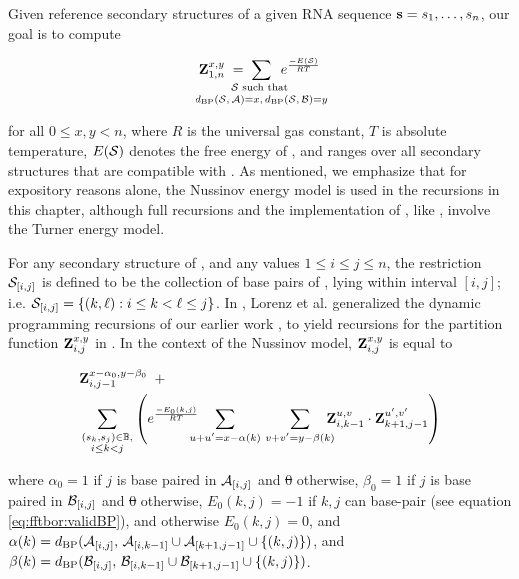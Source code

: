 \documentclass[11pt, oneside]{Thesis} %
\providecommand{\DIFadd}[1]{{\protect\color{blue}\uwave{#1}}} %
\providecommand{\DIFdel}[1]{{\protect\color{red}\sout{#1}}}                      %
\providecommand{\DIFaddbegin}{} %
\providecommand{\DIFaddend}{} %
\providecommand{\DIFdelbegin}{} %
\providecommand{\DIFdelend}{} %
\begin{document}
Given reference secondary structures \strAB of a
given RNA sequence ${\bf s}=s_1,\dots,s_n$, our goal is to compute

\begin{align}
\label{eq:ffttwo:sumBoltzFactors}
\bfZ{x,y}{1,n}\;=\;
\sum_{\mathclap{\substack{
\str \text{ such that } \rule[-.5ex]{0pt}{0pt} \\
\dBP{\str}{\strA} = x,\,\dBP{\str}{\strB} = y}}}\enspace
\boltzF{\str}
\end{align}

for all $0 \leq x,y < n$, where $R$ is the universal gas constant, $T$
is absolute temperature, $E(\mathcal S)$ denotes the free energy of \str,
and \str ranges
over all secondary structures that are compatible with \seq. As mentioned,
we emphasize that for expository reasons alone, the Nussinov energy model is
used in the recursions in this chapter, although full recursions and
the implementation of \ffttwo, like \fftbor, involve the Turner energy model.

For any secondary structure \str of \seq, and any values
$1 \leq i \leq j \leq n$, the restriction $\mathcal S_{[i,j]}$ is defined to be the
collection of base pairs of \str, lying within interval $[i,j]$; i.e.
$\mathcal S_{[i,j]} = \{ (k, \ell) : i \leq k < \ell \leq j \}$.
In \citep{hofacker:RNAbor2D}, Lorenz et al. generalized
the dynamic programming recursions of our earlier work \citep{freyhult.b07},
to yield recursions
for the partition function ${\bf Z}^{x,y}_{i,j}$ in
. In the context of the Nussinov model,
${\bf Z}^{x,y}_{i,j}$ is equal to

\begin{align}
\label{eq:ffttwo:bfZabij}
\begin{split}
& \bfZ{x-\alpha_0,y-\beta_0}{i,j-1}\enspace + \\
& \sum_{\substack{(s_k,s_j) \in \bpSet, \\ i \le k<j}}
\left(
\boltzNuss{k,j}\quad
\sum_{\mathclap{u+u'=x-\alpha(k)}}\hspace{3.75em}
\sum_{\mathclap{v+v'=y-\beta(k)}}\quad
\bfZ{u,v}{i,k-1} \cdot \bfZ{u',v'}{k+1,j-1}
\right)
\end{split}
\end{align}

where $\alpha_0 = 1$ if $j$ is base paired in $\mathcal A_{[i,j]}$ and \DIFdelbegin \DIFdel{0 }\DIFdelend \DIFaddbegin \DIFadd{$0$ }\DIFaddend otherwise,
$\beta_0 = 1$ if $j$ is base paired in $\mathcal B_{[i,j]}$ and \DIFdelbegin \DIFdel{0 }\DIFdelend \DIFaddbegin \DIFadd{$0$ }\DIFaddend otherwise,
$E_0(k,j)=-1$ if $k,j$ can base-pair
(see equation \ref{eq:fftbor:validBP}), and otherwise $E_0(k,j)=0$, and
$\alpha(k) =
d_{\text{BP}}(\mathcal A_{[i,j]},\,\mathcal A_{[i,k-1]} \cup \mathcal A_{[k+1,j-1]} \cup \{ (k,j) \})$,
and
$\beta(k) =
d_{\text{BP}}(\mathcal B_{[i,j]},\,\mathcal B_{[i,k-1]} \cup \mathcal B_{[k+1,j-1]} \cup \{ (k,j) \})$.
\end{document}
